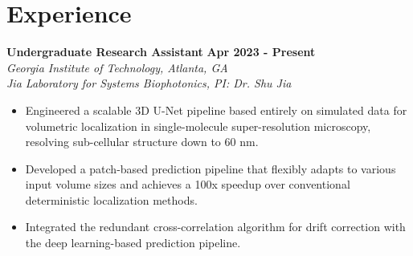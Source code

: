 \documentclass[letterpaper, 11pt]{article}
\newcommand{\subsectionvspace}{\vspace{8pt}}
\begin{document}
\section{Experience}




    \textbf{Undergraduate Research Assistant} \hfill 
    \textbf{Apr 2023 - Present} \\
    \textit{Georgia Institute of Technology, Atlanta, GA} \\
    \textit{Jia Laboratory for Systems Biophotonics, PI: Dr. Shu Jia}
    \begin{itemize}
        \item Engineered a scalable 3D U-Net pipeline based entirely on simulated data for volumetric localization in single-molecule super-resolution microscopy, resolving sub-cellular structure down to 60 nm.
        \item Developed a patch-based prediction pipeline that flexibly adapts to various input volume sizes and achieves a 100x speedup over conventional deterministic localization methods.
        \item Integrated the redundant cross-correlation algorithm for drift correction with the deep learning-based prediction pipeline.
    \end{itemize}

    \subsectionvspace
\end{document}
